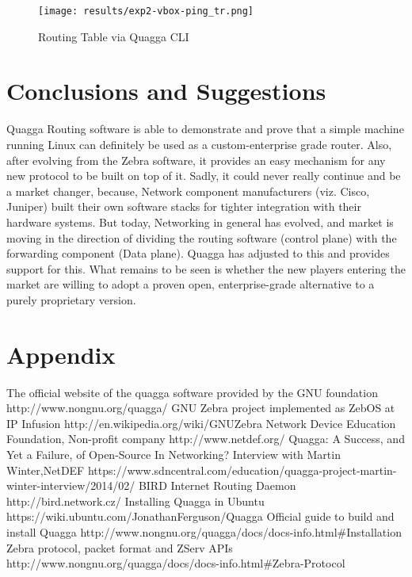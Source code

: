 \documentclass{article}
\begin{document}
\begin{figure}[ht!]
  \centering
  \texttt{[image: results/exp2-vbox-ping\_tr.png]}
  \caption{Routing Table via Quagga CLI}
  \label{fig:exp2-vbox-ping_tr}
\end{figure}

\clearpage
\section{Conclusions and Suggestions}
Quagga Routing software is able to demonstrate and prove that a simple machine running Linux can definitely
be used as a custom-enterprise grade router. Also, after evolving from the Zebra software, it provides an
easy mechanism for any new protocol to be built on top of it. Sadly, it could never really continue and
be a market changer, because, Network component manufacturers (viz. Cisco, Juniper) built their own software
stacks for tighter integration with their hardware systems. But today, Networking in general has evolved, and
market is moving in the direction of dividing the routing software (control plane) with the forwarding
component (Data plane). Quagga has adjusted to this and provides support for this. What remains to be seen
is whether the new players entering the market are willing to adopt a proven open, enterprise-grade 
alternative to a purely proprietary version.
\clearpage
%
%
\section{Appendix}
\label{sec:appendix}


\clearpage
\begin{thebibliography}{9}
  The official website of the quagga software provided by the GNU foundation http://www.nongnu.org/quagga/
  GNU Zebra project implemented as ZebOS at IP Infusion http://en.wikipedia.org/wiki/GNU\textunderscore Zebra
   Network Device Education Foundation, Non-profit company http://www.netdef.org/
   Quagga: A Success, and Yet a Failure, of Open-Source In Networking? Interview with Martin Winter,NetDEF https://www.sdncentral.com/education/quagga-project-martin-winter-interview/2014/02/
   BIRD Internet Routing Daemon http://bird.network.cz/
   Installing Quagga in Ubuntu https://wiki.ubuntu.com/JonathanFerguson/Quagga
   Official guide to build and install Quagga http://www.nongnu.org/quagga/docs/docs-info.html\#Installation
   Zebra protocol, packet format and ZServ APIs http://www.nongnu.org/quagga/docs/docs-info.html\#Zebra-Protocol
\end{thebibliography}
\end{document}
